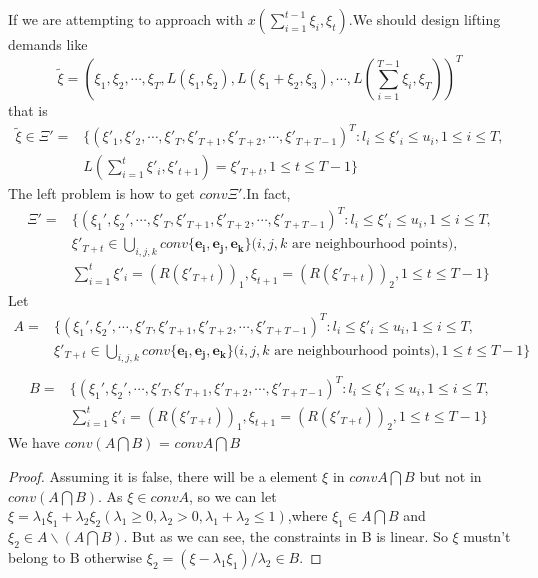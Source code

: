 \documentclass{article}
\begin{document}
If we are attempting to approach with $x(\sum\limits_{i=1}^{t-1}\xi_i,\xi_t)$.We should design lifting demands like
$$
\tilde{\xi}=(\xi_1,\xi_2,\cdots,\xi_T,L(\xi_1,\xi_2),L(\xi_1+\xi_2,\xi_3),\cdots,L(\sum\limits_{i=1}^{T-1}\xi_i,\xi_T))^T
$$
that is
$$
\begin{array}{ll}
\tilde{\xi} \in \Xi' =& \{(\xi'_1,\xi'_2,\cdots,\xi'_T,\xi'_{T+1},\xi'_{T+2},\cdots,\xi'_{T+T-1})^T:l_i\leq \xi'_i \leq u_i,1\leq i \leq T,\\
&L(\sum\limits_{i=1}^t \xi'_i,\xi'_{t+1}) = \xi'_{T+t}, 1\leq t\leq T-1\}
\end{array}
$$
The left problem is how to get $conv\Xi'$.In fact,
$$
\begin{array}{ll}
\Xi' = &\{(\xi_1',\xi_2',\cdots,\xi'_T,\xi'_{T+1},\xi'_{T+2},\cdots,\xi'_{T+T-1})^T:l_i\leq \xi'_i \leq u_i,1\leq i \leq T,\\
&\xi'_{T+t}\in \bigcup\limits_{i,j,k} conv\{\mathbf{e_i},\mathbf{e_j},\mathbf{e_k}\}\text{($i,j,k$ are neighbourhood points)},\\
& \sum\limits_{i=1}^t \xi'_i = (R(\xi'_{T+t}))_1,\xi_{t+1} = (R(\xi'_{T+t}))_2, 1\leq t\leq T-1 \}
\end{array}
$$
Let 
$$
\begin{array}{ll}
A = &\{(\xi_1',\xi_2',\cdots,\xi'_T,\xi'_{T+1},\xi'_{T+2},\cdots,\xi'_{T+T-1})^T:l_i\leq \xi'_i \leq u_i,1\leq i \leq T,\\
&\xi'_{T+t}\in \bigcup\limits_{i,j,k} conv\{\mathbf{e_i},\mathbf{e_j},\mathbf{e_k}\}\text{($i,j,k$ are neighbourhood points)},1\leq t\leq T-1\}\\
\end{array}
$$
$$
\begin{array}{ll}
B = &\{(\xi_1',\xi_2',\cdots,\xi'_T,\xi'_{T+1},\xi'_{T+2},\cdots,\xi'_{T+T-1})^T:l_i\leq \xi'_i \leq u_i,1\leq i \leq T,\\
& \sum\limits_{i=1}^t \xi'_i = (R(\xi'_{T+t}))_1,\xi_{t+1} = (R(\xi'_{T+t}))_2, 1\leq t\leq T-1 \}
\end{array}
$$
We have $conv(A\bigcap B)$ = $convA \bigcap B$
\begin{proof}
Assuming it is false, there will be a element $\xi$ in $convA \bigcap B$ but not in $conv(A\bigcap B)$. As $\xi \in convA$, so we can let $\xi = \lambda_1 \xi_1+\lambda_2 \xi_2 (\lambda_1\geq0,\lambda_2> 0,\lambda_1+\lambda_2 \leq 1)$,where $\xi_1 \in A\bigcap B$  and $\xi_2 \in A\backslash(A\bigcap B)$. But as we can see, the constraints in B is linear. So $\xi$ mustn't belong to B otherwise $\xi_2 = (\xi-\lambda_1 \xi_1)/\lambda_2 \in B$.
\end{proof}
\end{document}
